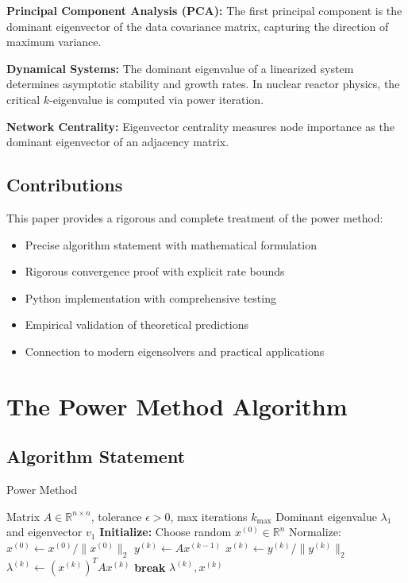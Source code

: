 \documentclass[11pt,twocolumn]{article}
\begin{document}
\textbf{Principal Component Analysis (PCA):} The first principal component is the dominant eigenvector of the data covariance matrix, capturing the direction of maximum variance.

\textbf{Dynamical Systems:} The dominant eigenvalue of a linearized system determines asymptotic stability and growth rates. In nuclear reactor physics, the critical $k$-eigenvalue is computed via power iteration.

\textbf{Network Centrality:} Eigenvector centrality measures node importance as the dominant eigenvector of an adjacency matrix.

\subsection{Contributions}

This paper provides a rigorous and complete treatment of the power method:
\begin{itemize}
\item Precise algorithm statement with mathematical formulation
\item Rigorous convergence proof with explicit rate bounds
\item Python implementation with comprehensive testing
\item Empirical validation of theoretical predictions
\item Connection to modern eigensolvers and practical applications
\end{itemize}

\section{The Power Method Algorithm}

\subsection{Algorithm Statement}

\begin{algorithm}[h]
\caption{Power Method}
\label{alg:power}
\begin{algorithmic}[1]
\Require Matrix $A \in \mathbb{R}^{n \times n}$, tolerance $\epsilon > 0$, max iterations $k_{\max}$
\Ensure Dominant eigenvalue $\lambda_1$ and eigenvector $v_1$
\State \textbf{Initialize:} Choose random $x^{(0)} \in \mathbb{R}^n$
\State Normalize: $x^{(0)} \leftarrow x^{(0)} / \|x^{(0)}\|_2$
    \State $y^{(k)} \leftarrow A x^{(k-1)}$ 
    \State $x^{(k)} \leftarrow y^{(k)} / \|y^{(k)}\|_2$ 
    \State $\lambda^{(k)} \leftarrow (x^{(k)})^T A x^{(k)}$ 
        \State \textbf{break} 
    \EndIf
\EndFor
\State \Return $\lambda^{(k)}, x^{(k)}$
\end{algorithmic}
\end{algorithm}
\end{document}
